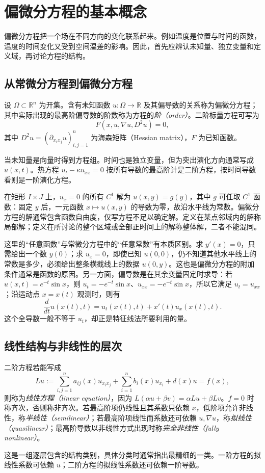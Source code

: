 \setcounter{chapter}{0} %
\chapter{偏微分方程的基本概念}
\label{chap:concepts}

偏微分方程把一个场在不同方向的变化联系起来。例如温度是位置与时间的函数，温度的时间变化又受到空间温差的影响。因此，首先应辨认未知量、独立变量和定义域，再讨论方程的结构。

\section{从常微分方程到偏微分方程}
\begin{definition}
设 $\Omega\subset\mathbb R^n$ 为开集。含有未知函数 $u:\Omega\to\mathbb R$ 及其偏导数的关系称为偏微分方程；其中实际出现的最高阶偏导数的阶数称为方程的\emph{阶（order）}。二阶标量方程可写为
\[
 F(x,u,\nabla u,D^2u)=0,
\]
其中 $D^2u=(\partial_{x_i x_j}u)_{i,j=1}^n$ 为海森矩阵（Hessian matrix），$F$ 为已知函数。
\end{definition}
当未知量是向量时得到方程组。时间也是独立变量，但为突出演化方向通常写成 $u(x,t)$。热方程 $u_t-\kappa u_{xx}=0$ 按所有导数的最高阶计是二阶方程，按时间导数看则是一阶演化方程。

在矩形 $I\times J$ 上，$u_x=0$ 的所有 $C^1$ 解为 $u(x,y)=g(y)$，其中 $g$ 可任取 $C^1$ 函数：固定 $y$ 后，一元函数 $x\mapsto u(x,y)$ 的导数为零，故沿水平线为常数。偏微分方程的解通常包含函数自由度，仅写方程不足以确定解。定义在某点邻域内的解称局部解；定义在所讨论的整个区域或全部正时间上的解称整体解，二者不能混同。

这里的“任意函数”与常微分方程中的“任意常数”有本质区别。求 $y'(x)=0$，只需给出一个数 $y(0)$；求 $u_x=0$，即使已知 $u(0,0)$，仍不知道其他水平线上的常数是多少，必须给出整条横截线上的数据 $u(0,y)$。这也是偏微分方程的附加条件通常是函数的原因。另一方面，偏导数是在其余变量固定时求导：若 $u(x,t)=e^{-t}\sin x$，则 $u_t=-e^{-t}\sin x$、$u_{xx}=-e^{-t}\sin x$，所以它满足 $u_t=u_{xx}$；沿运动点 $x=x(t)$ 观测时，则有
\[
 \frac d{dt}u(x(t),t)=u_t(x(t),t)+x'(t)u_x(x(t),t).
\]
这个全导数一般不等于 $u_t$，却正是特征线法所要利用的量。

\section{线性结构与非线性的层次}
\begin{definition}
二阶方程若能写成
\[
 Lu:=\sum_{i,j=1}^n a_{ij}(x)u_{x_ix_j}
       +\sum_{i=1}^n b_i(x)u_{x_i}+d(x)u=f(x),
\]
则称为\emph{线性方程（linear equation）}，因为 $L(\alpha u+\beta v)=\alpha Lu+\beta Lv$。$f=0$ 时称齐次，否则称非齐次。若最高阶项仍线性且其系数只依赖 $x$，低阶项允许非线性，称\emph{半线性（semilinear）}；若最高阶项线性而系数还可依赖 $u,\nabla u$，称\emph{拟线性（quasilinear）}；最高阶导数以非线性方式出现时称\emph{完全非线性（fully nonlinear）}。
\end{definition}
这是一组逐层包含的结构类别，具体分类时通常指出最精细的一类。一阶方程的拟线性系数可依赖 $u$；二阶方程的拟线性系数还可依赖一阶导数。

